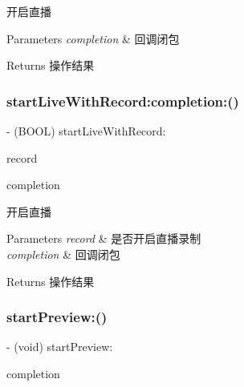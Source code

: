 开启直播 
\begin{DoxyParams}{Parameters}
{\em completion} & 回调闭包 \\
\hline
\end{DoxyParams}
\begin{DoxyReturn}{Returns}
操作结果 
\end{DoxyReturn}
\mbox{\label{interface_c_c_streamer_basic_a1a7e5e90d65f3a07b6de817b120e6f2a}} 
\subsubsection{\texorpdfstring{start\+Live\+With\+Record\+:completion\+:()}{startLiveWithRecord:completion:()}}
{\footnotesize\ttfamily -\/ (B\+O\+OL) start\+Live\+With\+Record\+: \begin{DoxyParamCaption}\item[{(B\+O\+OL)}]{record }\item[{completion:(C\+C\+Comletion\+Block)}]{completion }\end{DoxyParamCaption}}

开启直播 
\begin{DoxyParams}{Parameters}
{\em record} & 是否开启直播录制 \\
\hline
{\em completion} & 回调闭包 \\
\hline
\end{DoxyParams}
\begin{DoxyReturn}{Returns}
操作结果 
\end{DoxyReturn}
\mbox{\label{interface_c_c_streamer_basic_a719419e4a1d870d984373391e67eec27}} 
\subsubsection{\texorpdfstring{start\+Preview\+:()}{startPreview:()}}
{\footnotesize\ttfamily -\/ (void) start\+Preview\+: \begin{DoxyParamCaption}\item[{(C\+C\+Comletion\+Block)}]{completion }\end{DoxyParamCaption}}

